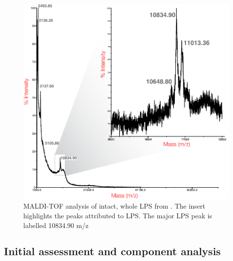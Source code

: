 		\begin{figure}[htb]
			\begin{center}
				\includegraphics[]{lps_chapter/img/malditof.pdf}
			\end{center}
			\caption[\Ac{MALDI-TOF} analysis of intact, whole \ac{LPS} from \caulobacter.]{\ac{MALDI-TOF} analysis of intact, whole \ac{LPS} from \caulobacter. The insert highlights the peaks attributed to \ac{LPS}. The major \ac{LPS} peak is labelled 10834.90 m/z}
			\label{fig:lpsmalditof}
		\end{figure}

	\subsection{Initial assessment and component analysis} %
	\label{sub:initial_assessment_and_component_analysis}


